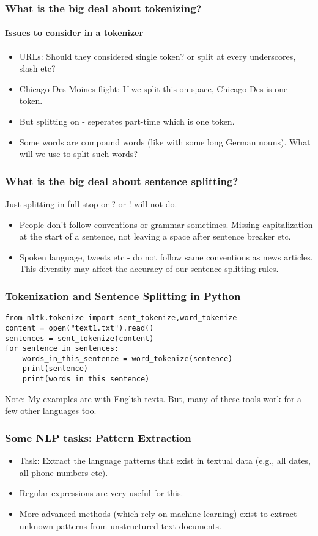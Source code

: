 \documentclass{beamer}
\begin{document}
\begin{frame}
\frametitle{What is the big deal about tokenizing?}
\framesubtitle{Issues to consider in a tokenizer}
\begin{itemize}
\item URLs: Should they considered single token? or split at every underscores, slash etc?
\item Chicago-Des Moines flight: If we split this on space, Chicago-Des is one token.
\item But splitting on - seperates part-time which is one token.
\item Some words are compound words (like with some long German nouns). What will we use to split such words? 
\end{itemize}
\end{frame}

\begin{frame}
\frametitle{What is the big deal about sentence splitting?}
Just splitting in full-stop or ? or ! will not do.
\begin{itemize}
\item People don't follow conventions or grammar sometimes. Missing capitalization at the start of a sentence, not leaving a space after sentence breaker etc.
\item Spoken language, tweets etc - do not follow same conventions as news articles. This diversity may affect the accuracy of our sentence splitting rules.
\end{itemize}
\end{frame}


\begin{frame}[fragile]
\frametitle{Tokenization and Sentence Splitting in Python}
\small
\begin{verbatim}
from nltk.tokenize import sent_tokenize,word_tokenize
content = open("text1.txt").read()
sentences = sent_tokenize(content)
for sentence in sentences:
    words_in_this_sentence = word_tokenize(sentence)
    print(sentence)
    print(words_in_this_sentence)
\end{verbatim}
Note: My examples are with English texts. But, many of these tools work for a few other languages too. 
\end{frame}

\begin{frame}
\frametitle{Some NLP tasks: Pattern Extraction}
\begin{itemize}
\item Task: Extract the language patterns that exist in textual data (e.g., all dates, all phone numbers etc). 
\item Regular expressions are very useful for this.
\item More advanced methods (which rely on machine learning) exist to extract unknown patterns from unstructured text documents.
\end{itemize}
\end{frame}
\end{document}
